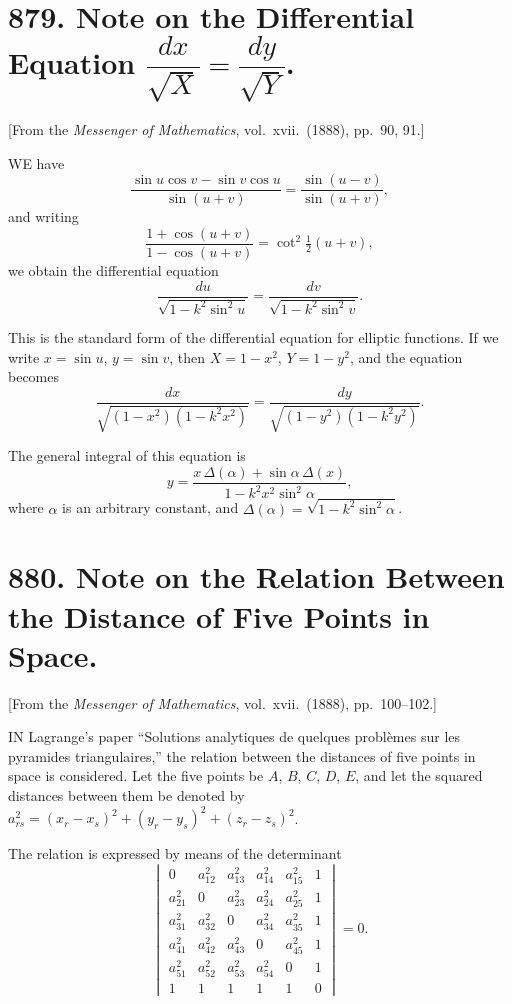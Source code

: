 \documentclass[12pt,a4paper]{article}
\theoremstyle{plain}
\begin{document}
\section[879]{879. Note on the Differential Equation $\dfrac{dx}{\sqrt{X}} = \dfrac{dy}{\sqrt{Y}}$.}
\label{sec:879}

[From the \textit{Messenger of Mathematics}, vol.\ xvii.\ (1888), pp.\ 90, 91.]

\medskip\noindent
WE have
\[
\frac{\sin u \cos v - \sin v \cos u}{\sin(u+v)} = \frac{\sin(u-v)}{\sin(u+v)},
\]
and writing
\[
\frac{1 + \cos(u+v)}{1 - \cos(u+v)} = \cot^{2}\tfrac{1}{2}(u+v),
\]
we obtain the differential equation
\[
\frac{du}{\sqrt{1 - k^{2}\sin^{2}u}} = \frac{dv}{\sqrt{1 - k^{2}\sin^{2}v}}.
\]

This is the standard form of the differential equation for elliptic functions. If we write $x = \sin u$, $y = \sin v$, then $X = 1 - x^{2}$, $Y = 1 - y^{2}$, and the equation becomes
\[
\frac{dx}{\sqrt{(1 - x^{2})(1 - k^{2}x^{2})}} = \frac{dy}{\sqrt{(1 - y^{2})(1 - k^{2}y^{2})}}.
\]

The general integral of this equation is
\[
y = \frac{x\,\Delta(\alpha) + \sin\alpha\,\Delta(x)}{1 - k^{2}x^{2}\sin^{2}\alpha},
\]
where $\alpha$ is an arbitrary constant, and $\Delta(\alpha) = \sqrt{1 - k^{2}\sin^{2}\alpha}$.

\newpage
\section[880]{880. Note on the Relation Between the Distance of Five Points in Space.}
\label{sec:880}

[From the \textit{Messenger of Mathematics}, vol.\ xvii.\ (1888), pp.\ 100--102.]

\medskip\noindent
IN Lagrange's paper ``Solutions analytiques de quelques probl\`emes sur les pyramides triangulaires,'' the relation between the distances of five points in space is considered. Let the five points be $A$, $B$, $C$, $D$, $E$, and let the squared distances between them be denoted by $a_{rs}^{2} = (x_{r} - x_{s})^{2} + (y_{r} - y_{s})^{2} + (z_{r} - z_{s})^{2}$.

The relation is expressed by means of the determinant
\[
\begin{vmatrix}
0 & a_{12}^{2} & a_{13}^{2} & a_{14}^{2} & a_{15}^{2} & 1 \\
a_{21}^{2} & 0 & a_{23}^{2} & a_{24}^{2} & a_{25}^{2} & 1 \\
a_{31}^{2} & a_{32}^{2} & 0 & a_{34}^{2} & a_{35}^{2} & 1 \\
a_{41}^{2} & a_{42}^{2} & a_{43}^{2} & 0 & a_{45}^{2} & 1 \\
a_{51}^{2} & a_{52}^{2} & a_{53}^{2} & a_{54}^{2} & 0 & 1 \\
1 & 1 & 1 & 1 & 1 & 0
\end{vmatrix} = 0.
\]
\end{document}
